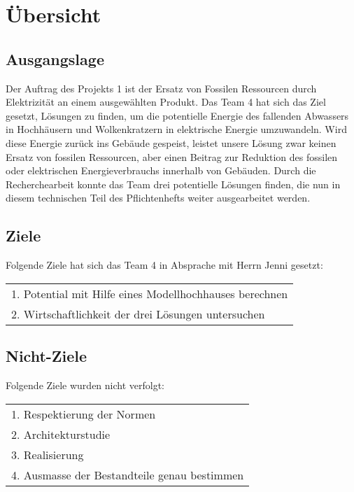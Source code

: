 \section{Übersicht} \label{sec:uebersicht}
\subsection{Ausgangslage}
Der Auftrag des Projekts 1 ist der Ersatz von Fossilen Ressourcen durch Elektrizität an einem ausgewählten Produkt. Das Team 4 hat sich das Ziel gesetzt, Lösungen zu finden, um die potentielle Energie des fallenden Abwassers in Hochhäusern und Wolkenkratzern in elektrische Energie umzuwandeln. Wird diese Energie zurück ins Gebäude gespeist, leistet unsere Lösung zwar keinen Ersatz von fossilen Ressourcen, aber einen Beitrag zur Reduktion des fossilen oder elektrischen Energieverbrauchs innerhalb von Gebäuden.
Durch die Recherchearbeit konnte das Team drei potentielle Lösungen finden, die nun in diesem technischen Teil des Pflichtenhefts weiter ausgearbeitet werden.

\subsection{Ziele}
Folgende Ziele hat sich das Team 4 in Absprache mit Herrn Jenni gesetzt:
\begin{table}[H]
\begin{tabular}{l}
\hline
1. Potential mit Hilfe eines Modellhochhauses berechnen\\
2. Wirtschaftlichkeit der drei Lösungen untersuchen\\
\hline
\end{tabular}
\end{table}

\subsection{Nicht-Ziele}
Folgende Ziele wurden nicht verfolgt:
\begin{table}[H]
\begin{tabular}{l}
\hline
1. Respektierung der Normen\\
2. Architekturstudie\\
3. Realisierung\\
4. Ausmasse der Bestandteile genau bestimmen\\
\hline
\end{tabular}
\end{table}
